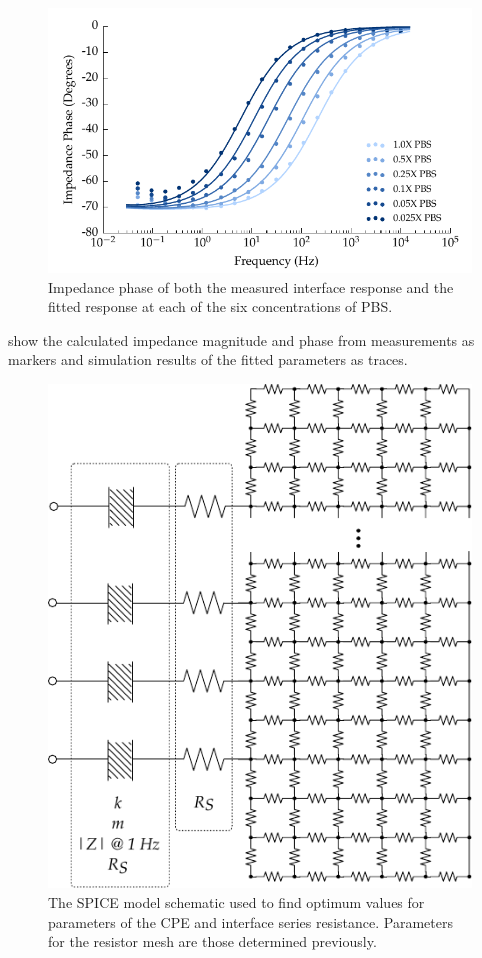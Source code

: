       \begin{figure}
        \centering
        \includegraphics{content/pt2/08-InterfaceParameters/graphics/displacement_impedanceVsFrequency_phase_thesis}
        \caption{\label{fig:pt2-graph_impedanceVsFrequency_phase}Impedance phase of both the measured interface response and the fitted response at each of the six concentrations of PBS.}
      \end{figure}
       show the calculated impedance magnitude and phase from measurements as markers and simulation results of the fitted parameters as traces.
      \begin{figure}
        \centering
        \includegraphics{content/pt2/08-InterfaceParameters/graphics/SpiceModel_opitimisation}
        \caption{\label{fig:pt2-spiceModel_optimisation}The SPICE model schematic used to find optimum values for parameters of the CPE and interface series resistance. Parameters for the resistor mesh are those determined previously.}
      \end{figure}
